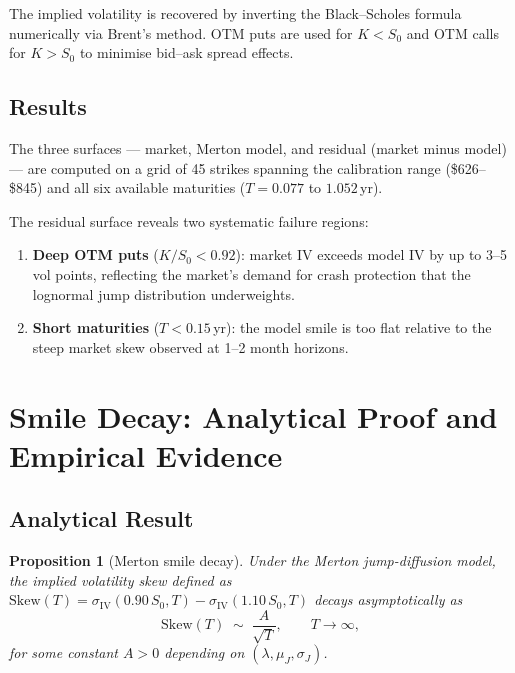 \documentclass[12pt, a4paper]{article}
\newtheorem{proposition}{Proposition}
\begin{document}
The implied volatility is recovered by inverting the Black--Scholes formula
numerically via Brent's method. OTM puts are used for $K < S_0$ and OTM calls
for $K > S_0$ to minimise bid--ask spread effects.

\subsection{Results}

The three surfaces --- market, Merton model, and residual (market minus model)
--- are computed on a grid of 45 strikes spanning the calibration range
(\$626--\$845) and all six available maturities ($T = 0.077$ to $1.052$\,yr).

The residual surface reveals two systematic failure regions:
\begin{enumerate}
    \item \textbf{Deep OTM puts} ($K/S_0 < 0.92$): market IV exceeds model IV
    by up to 3--5 vol points, reflecting the market's demand for crash
    protection that the lognormal jump distribution underweights.
    \item \textbf{Short maturities} ($T < 0.15$\,yr): the model smile is too
    flat relative to the steep market skew observed at 1--2 month horizons.
\end{enumerate}

\section{Smile Decay: Analytical Proof and Empirical Evidence}

\subsection{Analytical Result}

\begin{proposition}[Merton smile decay]
Under the Merton jump-diffusion model, the implied volatility skew defined as
$\mathrm{Skew}(T) = \sigma_{\mathrm{IV}}(0.90\,S_0, T) - \sigma_{\mathrm{IV}}(1.10\,S_0, T)$
decays asymptotically as
\[
    \mathrm{Skew}(T) \;\sim\; \frac{A}{\sqrt{T}}, \qquad T \to \infty,
\]
for some constant $A > 0$ depending on $(\lambda, \mu_J, \sigma_J)$.
\end{proposition}
\end{document}
